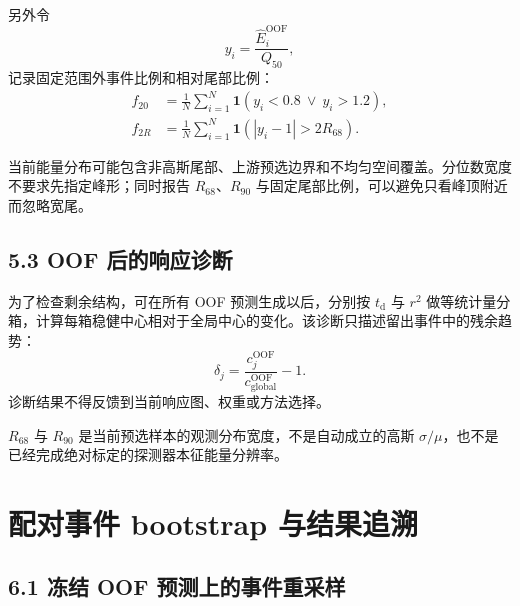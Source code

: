 \documentclass[UTF8,11pt,a4paper,oneside,fontset=none]{ctexart}
\newcommand{\Rsixtyeight}{R_{68}}
\newcommand{\Rninty}{R_{90}}
\newcommand{\OOF}{\mathrm{OOF}}
\begin{document}
另外令
\begin{equation}
  y_i=\frac{\widehat E_i^{\OOF}}{Q_{50}},
\end{equation}
记录固定范围外事件比例和相对尾部比例：
\begin{align}
  f_{20}
  &=\frac{1}{N}\sum_{i=1}^{N}
  \mathbf 1\!\left(y_i<0.8\ \lor\ y_i>1.2\right),\\
  f_{2R}
  &=\frac{1}{N}\sum_{i=1}^{N}
  \mathbf 1\!\left(|y_i-1|>2\Rsixtyeight\right).
\end{align}

\begin{infobox}[title={为什么主报分位数宽度？},fonttitle=\bfseries]
当前能量分布可能包含非高斯尾部、上游预选边界和不均匀空间覆盖。分位数宽度不要求先指定峰形；同时报告 $\Rsixtyeight$、$\Rninty$ 与固定尾部比例，可以避免只看峰顶附近而忽略宽尾。
\end{infobox}

\subsection*{5.3 OOF 后的响应诊断}

为了检查剩余结构，可在所有 OOF 预测生成以后，分别按 $t_{\mathrm d}$ 与 $r^2$ 做等统计量分箱，计算每箱稳健中心相对于全局中心的变化。该诊断只描述留出事件中的残余趋势：
\begin{equation}
  \delta_j
  =\frac{c_j^{\OOF}}{c_{\mathrm{global}}^{\OOF}}-1.
\end{equation}
诊断结果不得反馈到当前响应图、权重或方法选择。

\begin{boundarybox}[title={这些量不是什么},fonttitle=\bfseries]
$\Rsixtyeight$ 与 $\Rninty$ 是当前预选样本的观测分布宽度，不是自动成立的高斯 $\sigma/\mu$，也不是已经完成绝对标定的探测器本征能量分辨率。
\end{boundarybox}

\section{配对事件 bootstrap 与结果追溯}

\subsection*{6.1 冻结 OOF 预测上的事件重采样}
\end{document}
